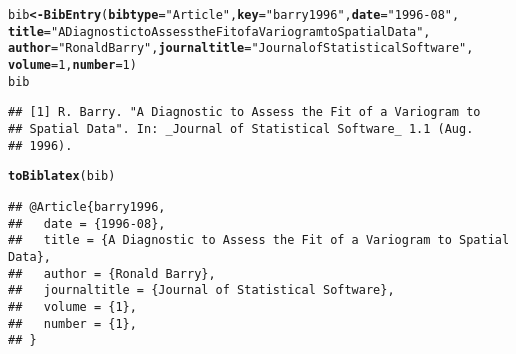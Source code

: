 \documentclass[article]{jss}\usepackage[]{graphicx}\usepackage[]{color}
\makeatletter
\newcommand{\hlnum}[1]{\textcolor[rgb]{0.125,0.125,1}{#1}}%
\newcommand{\hlstr}[1]{\textcolor[rgb]{0.125,0.125,1}{#1}}%
\newcommand{\hlstd}[1]{\textcolor[rgb]{0.251,0.251,0.282}{#1}}%
\newcommand{\hlkwb}[1]{\textcolor[rgb]{0.439,0.251,1}{\textbf{#1}}}%
\newcommand{\hlkwc}[1]{\textcolor[rgb]{0.529,0,0.184}{\textbf{#1}}}%
\newcommand{\hlkwd}[1]{\textcolor[rgb]{0.251,0.251,0.282}{\textbf{#1}}}%
\newenvironment{kframe}{%
 \def\at@end@of@kframe{}%
 \ifinner\ifhmode%
  \def\at@end@of@kframe{\end{minipage}}%
  \begin{minipage}{\columnwidth}%
 \fi\fi%
 \def\FrameCommand##1{\hskip\@totalleftmargin \hskip-\fboxsep
 \colorbox{shadecolor}{##1}\hskip-\fboxsep
     \hskip-\linewidth \hskip-\@totalleftmargin \hskip\columnwidth}%
 \MakeFramed {\advance\hsize-\width
   \@totalleftmargin\z@ \linewidth\hsize
   \@setminipage}}%
 {\par\unskip\endMakeFramed%
 \at@end@of@kframe}
\newenvironment{knitrout}{}{} %
\makeatother
\begin{document}
\begin{knitrout}
\color{fgcolor}\begin{kframe}
\begin{alltt}
\hlstd{bib} \hlkwb{<-} \hlkwd{BibEntry}\hlstd{(}\hlkwc{bibtype}\hlstd{=}\hlstr{"Article"}\hlstd{,} \hlkwc{key} \hlstd{=} \hlstr{"barry1996"}\hlstd{,} \hlkwc{date} \hlstd{=} \hlstr{"1996-08"}\hlstd{,}
  \hlkwc{title} \hlstd{=} \hlstr{"A Diagnostic to Assess the Fit of a Variogram to Spatial Data"}\hlstd{,}
  \hlkwc{author} \hlstd{=} \hlstr{"Ronald Barry"}\hlstd{,} \hlkwc{journaltitle} \hlstd{=} \hlstr{"Journal of Statistical Software"}\hlstd{,}
                 \hlkwc{volume} \hlstd{=} \hlnum{1}\hlstd{,} \hlkwc{number} \hlstd{=} \hlnum{1}\hlstd{)}
\hlstd{bib}
\end{alltt}
\begin{verbatim}
## [1] R. Barry. "A Diagnostic to Assess the Fit of a Variogram to
## Spatial Data". In: _Journal of Statistical Software_ 1.1 (Aug.
## 1996).
\end{verbatim}
\begin{alltt}
\hlkwd{toBiblatex}\hlstd{(bib)}
\end{alltt}
\begin{verbatim}
## @Article{barry1996,
##   date = {1996-08},
##   title = {A Diagnostic to Assess the Fit of a Variogram to Spatial Data},
##   author = {Ronald Barry},
##   journaltitle = {Journal of Statistical Software},
##   volume = {1},
##   number = {1},
## }
\end{verbatim}
\end{kframe}
\end{knitrout}
\end{document}
